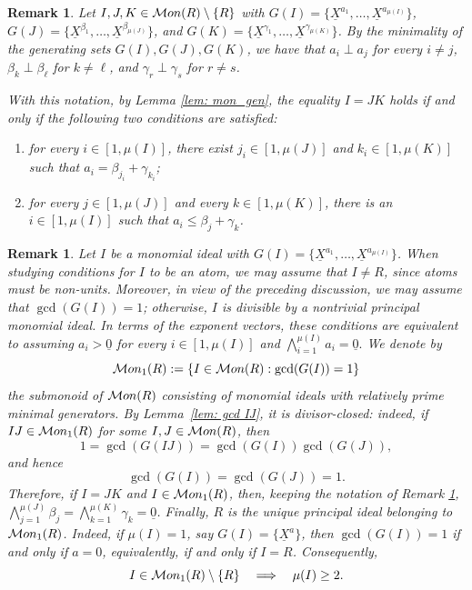 \documentclass[10pt,a4paper]{amsart}
\newtheorem{remark}[theorem]{Remark}
\providecommand\Mon{{\mathcal{M}{\rm on}}}
\begin{document}
\begin{remark}\label{rem: E1 E2}
    Let $I,J,K\in\Mon(R)\setminus\{R\}$ with $G(I) = \{\underline X^{a_1},\dots,\underline X^{a_{\mu(I)}}\}$, $G(J) = \{ \underline X^{\beta_1},\dots,\underline X^{\beta_{\mu(J)}} \}$, and $G(K) = \{ \underline X^{\gamma_1},\dots,\underline X^{\gamma_{\mu(K)}} \}$. By the minimality of the generating sets $G(I),G(J),G(K)$, we have that $a_i\perp a_j$ for every $i\neq j$, $\beta_k\perp\beta_\ell$ for $k\neq \ell$, and $\gamma_r\perp\gamma_s$ for $r\neq s$.

    With this notation, by Lemma \ref{lem: mon_gen}, the equality $I=JK$ holds if and only if the following two conditions are satisfied:
    \begin{enumerate}[label=\textup{\bf(E\arabic{*})}, mode=unboxed]
        \item\label{eq: I in JK} for every $i\in [1,\mu(I)]$, there exist $j_i\in [1,\mu(J)]$ and $k_i\in [1,\mu(K)]$ such that $a_i = \beta_{j_i}+\gamma_{k_i}$;
        \item\label{eq: JK in I} for every $j\in [1,\mu(J)]$ and every $k\in [1,\mu(K)]$, there is an $i\in [1,\mu(I)]$ such that $a_i \le \beta_j+\gamma_k$.
    \end{enumerate}
\end{remark}

\begin{remark}\label{rem: mon1 R}
    Let $I$ be a monomial ideal with $G(I) = \{\underline X^{a_1},\dots,\underline X^{a_{\mu(I)}}\}$. When studying conditions for $I$ to be an atom, we may assume that $I\neq R$, since atoms must be non-units. Moreover, in view of the preceding discussion, we may assume that $\gcd(G(I))=1$; otherwise, $I$ is divisible by a nontrivial principal monomial ideal. In terms of the exponent vectors, these conditions are equivalent to assuming $a_i> \underline 0$ for every $i\in [1,\mu(I)]$ and $\bigwedge_{i=1}^{\mu(I)}a_i=\underline 0.$ We denote by
    \[
        \Mon_1(R):=
        \{I\in\Mon(R):\gcd(G(I))=1\}
    \]
    the submonoid of $\Mon(R)$ consisting of monomial ideals with relatively prime minimal generators. By Lemma~\ref{lem: gcd IJ}, it is divisor-closed: indeed, if $IJ\in\Mon_1(R)$ for some $I,J\in\Mon(R)$, then
    \[
        1=\gcd(G(IJ))=\gcd(G(I))\gcd(G(J)),
    \]
    and hence
    \[
        \gcd(G(I))=\gcd(G(J))=1.
    \]
    Therefore, if $I=JK$ and $I\in\Mon_1(R)$, then, keeping the notation of Remark \ref{rem: E1 E2}, $\bigwedge_{j=1}^{\mu(J)} \beta_j = \bigwedge_{k=1}^{\mu(K)} \gamma_k = \underline 0$.
    Finally, $R$ is the unique principal ideal belonging to $\Mon_1(R)$.
    Indeed, if $\mu(I)=1$, say $G(I)=\{\underline X^{a}\}$, then $\gcd(G(I))=1$ if and only if $a=0$, equivalently, if and only if $I=R$. Consequently,
    \[
        I\in\Mon_1(R)\setminus\{R\}
        \quad\Longrightarrow\quad
        \mu(I)\ge 2.
    \]
\end{remark}
\end{document}
